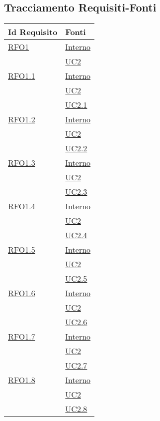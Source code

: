 \subsection{Tracciamento Requisiti-Fonti}
\normalsize
\begin{longtable}{|>{\centering}m{5cm}|m{5cm}<{\centering}|}
\hline 
\textbf{Id Requisito} & \textbf{Fonti}\\
\hline
\endhead
\hyperlink{RFO1}{RFO1} & \hyperlink{Interno}{Interno}\\
& \hyperref[UC2]{UC2}\\ \hline

\hyperlink{RFO1.1}{RFO1.1} & \hyperlink{Interno}{Interno}\\
& \hyperref[UC2]{UC2}\\
& \hyperref[UC2.1]{UC2.1}\\ \hline

\hyperlink{RFO1.2}{RFO1.2} & \hyperlink{Interno}{Interno}\\
& \hyperref[UC2]{UC2}\\
& \hyperref[UC2.2]{UC2.2}\\ \hline

\hyperlink{RFO1.3}{RFO1.3} & \hyperlink{Interno}{Interno}\\
& \hyperref[UC2]{UC2}\\
& \hyperref[UC2.3]{UC2.3}\\ \hline

\hyperlink{RFO1.4}{RFO1.4} & \hyperlink{Interno}{Interno}\\
& \hyperref[UC2]{UC2}\\
& \hyperref[UC2.4]{UC2.4}\\ \hline

\hyperlink{RFO1.5}{RFO1.5} & \hyperlink{Interno}{Interno}\\
& \hyperref[UC2]{UC2}\\
& \hyperref[UC2.5]{UC2.5}\\ \hline

\hyperlink{RFO1.6}{RFO1.6} & \hyperlink{Interno}{Interno}\\
& \hyperref[UC2]{UC2}\\
& \hyperref[UC2.6]{UC2.6}\\ \hline

\hyperlink{RFO1.7}{RFO1.7} & \hyperlink{Interno}{Interno}\\
& \hyperref[UC2]{UC2}\\
& \hyperref[UC2.7]{UC2.7}\\ \hline

\hyperlink{RFO1.8}{RFO1.8} & \hyperlink{Interno}{Interno}\\
& \hyperref[UC2]{UC2}\\
& \hyperref[UC2.8]{UC2.8}\\ \hline


\end{longtable}
